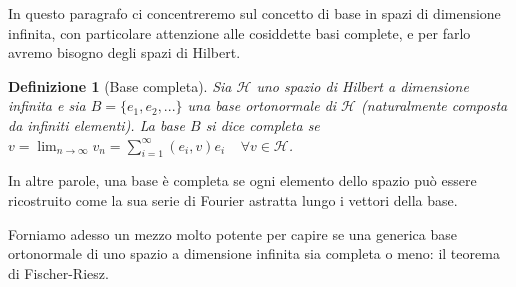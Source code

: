 \documentclass[a4paper,12pt]{report}
\newtheorem{definizione}{Definizione}[chapter]
\begin{document}
In questo paragrafo ci concentreremo sul concetto di base in spazi di dimensione infinita, con particolare attenzione alle cosiddette basi complete, e per farlo avremo bisogno degli spazi di Hilbert.

\begin{definizione}[Base completa]\label{def: 2.12}
    Sia $\mathscr{H}$ uno spazio di Hilbert a dimensione infinita e sia $B=\{e_1,e_2,...\}$ una base ortonormale di $\mathscr{H}$ (naturalmente composta da infiniti elementi). La base $B$ si dice completa se $v=\displaystyle\lim_{n \to \infty}v_n=\sum_{i=1}^{\infty}(e_i,v)e_i \ \ \ \ \ \forall v \in \mathscr{H}$.
\end{definizione}

In altre parole, una base è completa se ogni elemento dello spazio può essere ricostruito come la sua serie di Fourier astratta lungo i vettori della base.

Forniamo adesso un mezzo molto potente per capire se una generica base ortonormale di uno spazio a dimensione infinita sia completa o meno: il teorema di Fischer-Riesz.
\end{document}
